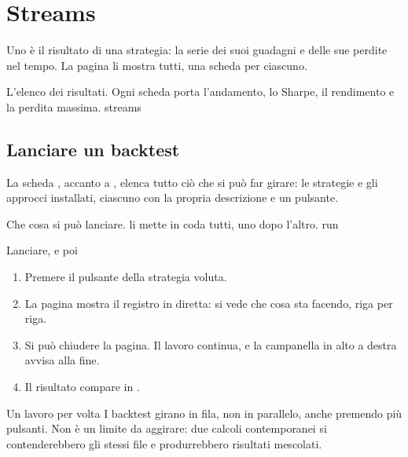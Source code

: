 \chapter{Streams}\label{cap:streams}

Uno  è il risultato di una strategia: la serie dei suoi
guadagni e delle sue perdite nel tempo. La pagina  li mostra
tutti, una scheda per ciascuno.

  {L'elenco dei risultati. Ogni scheda porta l'andamento, lo Sharpe, il
   rendimento e la perdita massima.}
  {streams}

\section{Lanciare un backtest}\label{sez:run}

La scheda , accanto a , elenca tutto ciò
che si può far girare: le strategie e gli approcci installati, ciascuno con
la propria descrizione e un pulsante.

  {Che cosa si può lanciare.  li mette in coda tutti, uno
   dopo l'altro.}
  {run}

\begin{pratica}{Lanciare, e poi}
\begin{enumerate}
  \item Premere il pulsante della strategia voluta.
  \item La pagina mostra il registro in diretta: si vede che cosa sta
        facendo, riga per riga.
  \item Si può chiudere la pagina. Il lavoro continua, e la campanella in
        alto a destra avvisa alla fine.
  \item Il risultato compare in .
\end{enumerate}
\end{pratica}

\begin{attenzione}{Un lavoro per volta}
I backtest girano in fila, non in parallelo, anche premendo più pulsanti.
Non è un limite da aggirare: due calcoli contemporanei si contenderebbero
gli stessi file e produrrebbero risultati mescolati.
\end{attenzione}

